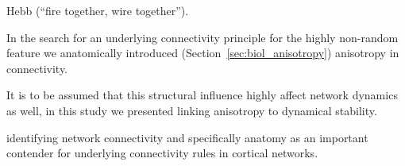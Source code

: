 

Hebb
(\enquote{fire together, wire together}). 


In the search for an underlying connectivity principle for the highly
non-random feature we anatomically introduced
(Section~\ref{sec:biol_anisotropy}) anisotropy in connectivity.

It is to be assumed that this structural influence highly affect
network dynamics as well, in this study we presented linking
anisotropy to dynamical stability.

identifying network connectivity and specifically anatomy as an
important contender for underlying connectivity rules in cortical networks.

